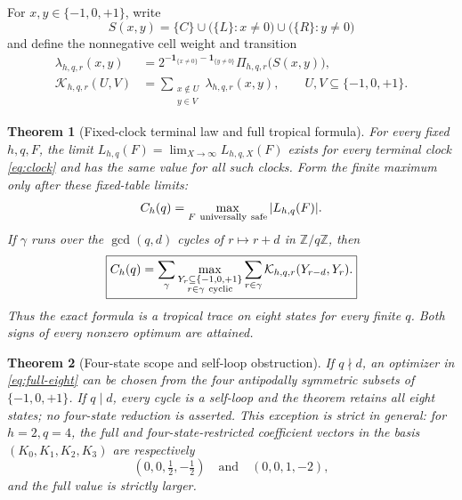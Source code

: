 \documentclass[11pt]{article}
\newtheorem{theorem}{Theorem}[section]
\theoremstyle{definition}
\theoremstyle{remark}
\newcommand{\ind}{\mathbf 1}
\newcommand{\T}{\{-1,0,+1\}}
\newcommand{\Z}{\mathbb Z}
\begin{document}
For \(x,y\in\T\), write
\begin{equation}
 S(x,y)=\{C\}\cup\bigl(\{L\}:x\ne0\bigr)
 \cup\bigl(\{R\}:y\ne0\bigr)
 \label{eq:Sxy}
\end{equation}
and define the nonnegative cell weight and transition
\begin{align}
 \lambda_{h,q,r}(x,y)
 &=2^{-\ind_{\{x\ne0\}}-\ind_{\{y\ne0\}}}
 \Pi_{h,q,r}\bigl(S(x,y)\bigr),
 \label{eq:lambda}\\
 \mathcal K_{h,q,r}(U,V)
 &=\sum_{\substack{x\notin U\\y\in V}}
 \lambda_{h,q,r}(x,y),
 \qquad U,V\subseteq\T.
 \label{eq:transition}
\end{align}

\begin{theorem}[Fixed-clock terminal law and full tropical formula]
\label{thm:fixed-clock}
For every fixed \(h,q,F\), the limit
\(L_{h,q}(F)=\lim_{X\to\infty}L_{h,q,X}(F)\) exists for every terminal
clock \eqref{eq:clock} and has the same value for all such clocks.  Form
the finite maximum only after these fixed-table limits:
\begin{equation}
 C_h(q)=\max_{F\ {\rm universally\ safe}}|L_{h,q}(F)|.
 \label{eq:capacity}
\end{equation}
If \(\gamma\) runs over the \(\gcd(q,d)\) cycles of
\(r\mapsto r+d\) in \(\Z/q\Z\), then
\begin{equation}
 \boxed{
 C_h(q)=\sum_\gamma
 \max_{\substack{Y_r\subseteq\T\\r\in\gamma\ {\rm cyclic}}}
 \sum_{r\in\gamma}\mathcal K_{h,q,r}(Y_{r-d},Y_r).}
 \label{eq:full-eight}
\end{equation}
Thus the exact formula is a tropical trace on eight states for every
finite \(q\).  Both signs of every nonzero optimum are attained.
\end{theorem}

\begin{theorem}[Four-state scope and self-loop obstruction]
\label{thm:compression}
If \(q\nmid d\), an optimizer in \eqref{eq:full-eight} can be chosen from
the four antipodally symmetric subsets of \(\T\).  If \(q\mid d\), every
cycle is a self-loop and the theorem retains all eight states; no
four-state reduction is asserted.  This exception is strict in general:
for \(h=2,q=4\), the full and four-state-restricted coefficient vectors in
the basis \((K_0,K_1,K_2,K_3)\) are respectively
\begin{equation}
 (0,0,\tfrac12,-\tfrac12)
 \quad\text{and}\quad
 (0,0,1,-2),
 \label{eq:self-loop-obstruction}
\end{equation}
and the full value is strictly larger.
\end{theorem}
\end{document}
